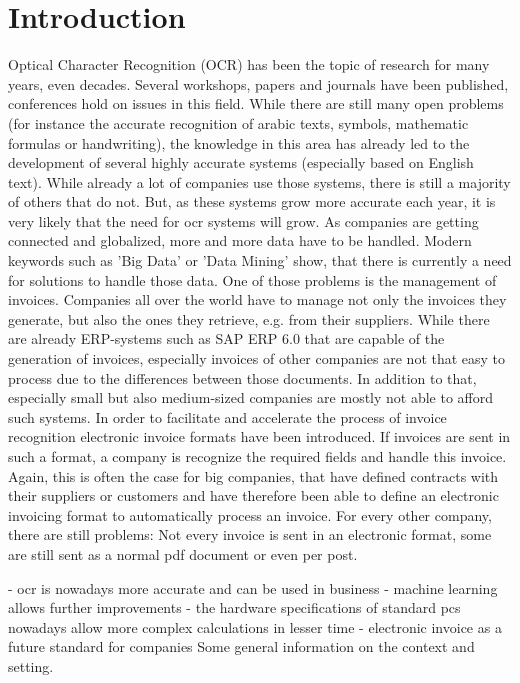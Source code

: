 %
% 

\chapter{Introduction}

Optical Character Recognition (OCR) has been the topic of research for many years, even decades. Several workshops, papers and journals have been published, conferences hold on issues in this field. While there are still many open problems (for instance the accurate recognition of arabic texts, symbols, mathematic formulas or handwriting), the knowledge in this area has already led to the development of several highly accurate systems (especially based on English text).
While already a lot of companies use those systems, there is still a majority of others that do not. But, as these systems grow more accurate each year, it is very likely that the need for ocr systems will grow.
As companies are getting connected and globalized, more and more data have to be handled. Modern keywords such as 'Big Data' or 'Data Mining' show, that there is currently a need for solutions to handle those data.
One of those problems is the management of invoices. Companies all over the world have to manage not only the invoices they generate, but also the ones they retrieve, e.g. from their suppliers. While there are already ERP-systems such as SAP ERP 6.0 that are capable of the generation of invoices, especially invoices of other companies are not that easy to process due to the differences between those documents. In addition to that, especially small but also medium-sized companies are mostly not able to afford such systems.
In order to facilitate and accelerate the process of invoice recognition electronic invoice formats have been introduced. If invoices are sent in such a format, a company is recognize the required fields and handle this invoice. Again, this is often the case for big companies, that have defined contracts with their suppliers or customers and have therefore been able to define an electronic invoicing format to automatically process an invoice.
For every other company, there are still problems: Not every invoice is sent in an electronic format, some are still sent as a normal pdf document or even per post.

 
- ocr is nowadays more accurate and can be used in business
- machine learning allows further improvements
- the hardware specifications of standard pcs nowadays allow more complex calculations in lesser time
- electronic invoice as a future standard for companies
Some general information on the context and setting. %


